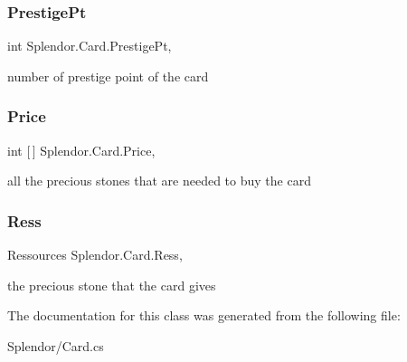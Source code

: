 \mbox{\label{class_splendor_1_1_card_a117119ceac083b7b7d39f11e5bbd7225}} 
\subsubsection{\texorpdfstring{Prestige\+Pt}{PrestigePt}}
{\footnotesize\ttfamily int Splendor.\+Card.\+Prestige\+Pt\hspace{0.3cm}{\ttfamily [get]}, {\ttfamily [set]}}



number of prestige point of the card 

\mbox{\label{class_splendor_1_1_card_afee1b5ccf0c6745bdd9b7642a0158fae}} 
\subsubsection{\texorpdfstring{Price}{Price}}
{\footnotesize\ttfamily int \mbox{[}$\,$\mbox{]} Splendor.\+Card.\+Price\hspace{0.3cm}{\ttfamily [get]}, {\ttfamily [set]}}



all the precious stones that are needed to buy the card 

\mbox{\label{class_splendor_1_1_card_afcfaa7ea5072b3cd30c04adddc8dd5c7}} 
\subsubsection{\texorpdfstring{Ress}{Ress}}
{\footnotesize\ttfamily Ressources Splendor.\+Card.\+Ress\hspace{0.3cm}{\ttfamily [get]}, {\ttfamily [set]}}



the precious stone that the card gives 



The documentation for this class was generated from the following file\+:\begin{DoxyCompactItemize}
\item 
Splendor/Card.\+cs\end{DoxyCompactItemize}
